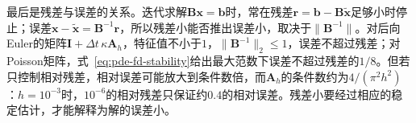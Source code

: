 最后是残差与误差的关系。迭代求解$\bm B\bm x=\bm b$时，常在残差$\bm r=\bm b-\bm B\tilde{\bm x}$足够小时停止；误差$\bm x-\tilde{\bm x}=\bm B^{-1}\bm r$，所以残差小能否推出误差小，取决于$\|\bm B^{-1}\|$。对后向Euler的矩阵$\bm I+\Delta t\,\kappa\bm A_h$，特征值不小于$1$，$\|\bm B^{-1}\|_2\leq1$，误差不超过残差；对Poisson矩阵，式~\eqref{eq:pde-fd-stability}给出最大范数下误差不超过残差的$1/8$。但若只控制相对残差，相对误差可能放大到条件数倍，而$\bm A_h$的条件数约为$4/(\pi^2h^2)$：$h=10^{-3}$时，$10^{-6}$的相对残差只保证约$0.4$的相对误差。残差小要经过相应的稳定估计，才能解释为解的误差小。

